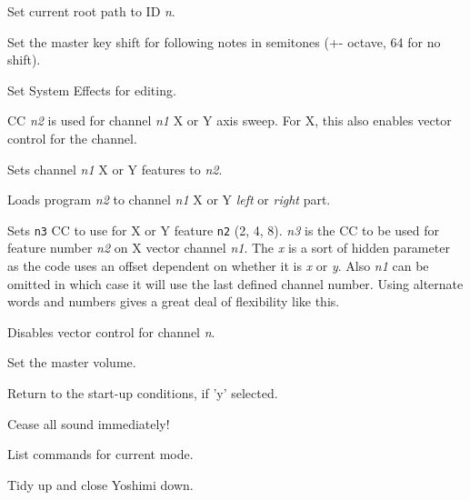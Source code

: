       Set current root path to ID \textsl{n}.

      Set the master key shift for following notes in semitones (+-
      octave, 64 for no shift).

      Set System Effects for editing.

      CC \textsl{n2} is used for channel \textsl{n1} X or Y axis sweep.
      For X, this also enables vector control for the channel.

      Sets channel \textsl{n1} X or Y features to \textsl{n2}.

      Loads program \textsl{n2} to channel \textsl{n1} X or Y
      \textsl{left} or \textsl{right} part.

      Sets \texttt{n3} CC to use for X or Y feature \texttt{n2} (2, 4, 8).
      \textsl{n3} is the CC to be used for feature number \textsl{n2} on X
      vector channel \textsl{n1}. The \textsl{x} is a sort of hidden parameter
      as the code uses an offset dependent on whether it is \textsl{x} or
      \textsl{y}. Also \textsl{n1} can be omitted in which case it will use the
      last defined channel number. Using alternate words and numbers gives a
      great deal of flexibility like this.

      Disables vector control for channel \textsl{n}.

      Set the master volume.

      Return to the start-up conditions, if 'y' selected.

      Cease all sound immediately!

      List commands for current mode.

         Tidy up and close Yoshimi down.

